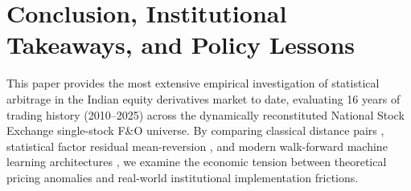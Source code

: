 \documentclass[11pt,a4paper]{article}
\begin{document}
\section{Conclusion, Institutional Takeaways, and Policy Lessons}
\label{sec:conclusion}

This paper provides the most extensive empirical investigation of statistical arbitrage in the Indian equity derivatives market to date, evaluating 16 years of trading history (2010--2025) across the dynamically reconstituted National Stock Exchange single-stock F\&O universe. By comparing classical distance pairs \citep{gatev2006pairs}, statistical factor residual mean-reversion \citep{avellaneda2010statistical}, and modern walk-forward machine learning architectures \citep{gu2020empirical,guijarro2021deep}, we examine the economic tension between theoretical pricing anomalies and real-world institutional implementation frictions.
\end{document}
